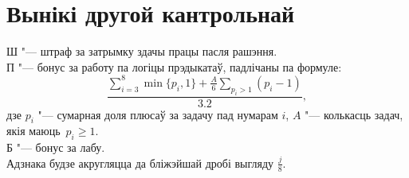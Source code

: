 


    \section{Вынікі другой кантрольнай}
    \noindent Ш "--- штраф за затрымку здачы працы пасля рашэння. \\
    П "--- бонус за работу па логіцы прэдыкатаў, падлічаны па формуле:
    $$\dfrac{\sum \limits _{i=3} ^8 \min\{p_i, 1\} + \frac{A}{6} \sum \limits _{p_i > 1} (p_i - 1)}{3.2},$$
    дзе $p_i$ "--- сумарная доля плюсаў за задачу пад нумарам $i$, $A$ "--- колькасць задач, якія маюць~$p_i \geqslant 1$. \\
    Б "--- бонус за лабу. \\
    Адзнака будзе акругляцца да бліжэйшай дробі выгляду $\frac{j}{8}$.
